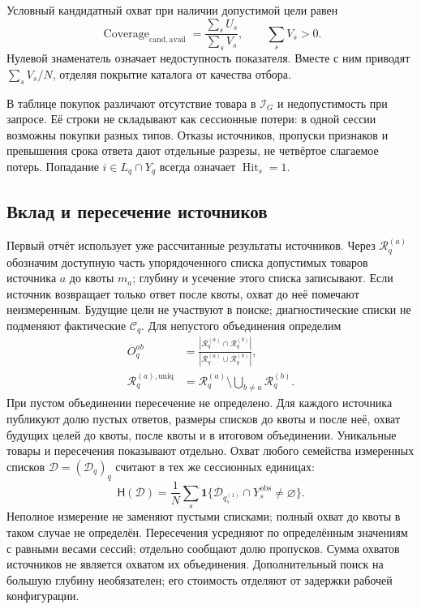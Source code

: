 \documentclass[12pt,a4paper]{article}
\newcommand{\ind}{\mathbf 1}
\theoremstyle{plainru}
\begin{document}
Условный кандидатный охват при наличии допустимой цели равен
\begin{equation}\label{eq:eval-candidate-conditional}
\operatorname{Coverage}_{\mathrm{cand,avail}}
=\frac{\sum_sU_s}{\sum_sV_s},\qquad \sum_sV_s>0.
\end{equation}
Нулевой знаменатель означает недоступность показателя.
Вместе с ним приводят $\sum_sV_s/N$, отделяя покрытие каталога
от качества отбора.

В таблице покупок различают отсутствие товара в $\mathcal I_G$
и недопустимость при запросе. Её строки не складывают как сессионные
потери: в одной сессии возможны покупки разных типов.
Отказы источников, пропуски признаков и превышения срока ответа
дают отдельные разрезы, не четвёртое слагаемое потерь.
Попадание $i\in L_q\cap Y_q$ всегда означает $\operatorname{Hit}_s=1$.

\subsection{Вклад и пересечение источников}
\label{sec:eval-source-contribution}

Первый отчёт использует уже рассчитанные результаты источников.
Через $\mathcal R_q^{(a)}$ обозначим доступную часть упорядоченного
списка допустимых товаров источника $a$ до квоты $m_a$;
глубину и усечение этого списка записывают. Если источник возвращает
только ответ после квоты, охват до неё помечают неизмеренным.
Будущие цели не участвуют в поиске; диагностические списки
не подменяют фактические $\mathcal C_q$.
Для непустого объединения определим
\begin{align}\label{eq:eval-source-overlap}
O_q^{ab}&=\frac{|\mathcal R_q^{(a)}\cap\mathcal R_q^{(b)}|}
 {|\mathcal R_q^{(a)}\cup\mathcal R_q^{(b)}|},\\
\mathcal R_q^{(a),\mathrm{uniq}}
&=\mathcal R_q^{(a)}\setminus\bigcup_{b\ne a}\mathcal R_q^{(b)}.
\nonumber
\end{align}
При пустом объединении пересечение не определено. Для каждого
источника публикуют долю пустых ответов, размеры списков до квоты
и после неё, охват будущих целей до квоты, после квоты и в итоговом
объединении. Уникальные товары и пересечения показывают отдельно.
Охват любого семейства измеренных списков $\mathcal D=(\mathcal D_q)_q$
считают в тех же сессионных единицах:
\begin{equation}\label{eq:eval-source-coverage}
\mathsf H(\mathcal D)
=\frac1N\sum_s\ind\{\mathcal D_{q_s^{(1)}}\cap Y_s^{\mathrm{obs}}\ne\varnothing\}.
\end{equation}
Неполное измерение не заменяют пустыми списками; полный охват
до квоты в таком случае не определён. Пересечения усредняют
по определённым значениям с равными весами сессий;
отдельно сообщают долю пропусков.
Сумма охватов источников не является охватом их объединения.
Дополнительный поиск на большую глубину необязателен; его стоимость
отделяют от задержки рабочей конфигурации.
\end{document}
